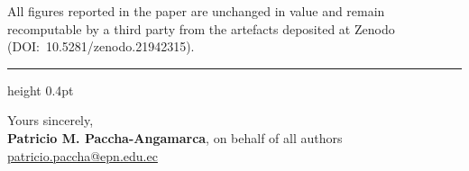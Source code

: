 \documentclass[10pt,a4paper]{article}
\begin{document}
All figures reported in the paper are unchanged in value and remain recomputable by a third party from the artefacts deposited at Zenodo (DOI:~10.5281/zenodo.21942315).

\vspace{10pt}
\hrule height 0.4pt
\vspace{8pt}

\noindent Yours sincerely,\\[10pt]
\textbf{Patricio M. Paccha-Angamarca}, on behalf of all authors\\
\href{mailto:patricio.paccha@epn.edu.ec}{patricio.paccha@epn.edu.ec}
\end{document}
